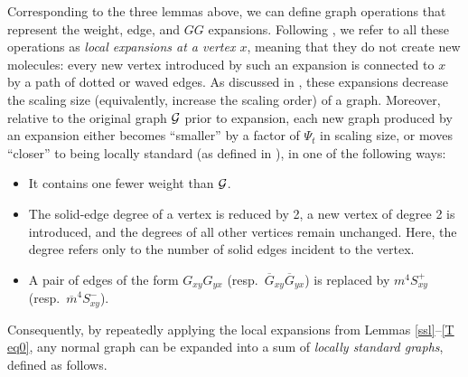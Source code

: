 Corresponding to the three lemmas above, we can define graph operations that represent the weight, edge, and $GG$ expansions. Following \cite{yang2021delocalization}, we refer to all these operations as \emph{local expansions at a vertex $x$}, meaning that they do not create new molecules: every new vertex introduced by such an expansion is connected to $x$ by a path of dotted or waved edges. 
As discussed in \cite[Section 3]{yang2021delocalization}, these expansions decrease the scaling size (equivalently, increase the scaling order) of a graph. Moreover, relative to the original graph $\cal G$ prior to expansion, each new graph produced by an expansion either becomes ``smaller'' by a factor of $\Psi_t$ in scaling size, or moves ``closer'' to being locally standard (as defined in ), in one of the following ways:
\begin{itemize}
    
\item It contains one fewer weight than $\cal G$.

\item The solid-edge degree of a vertex is reduced by 2, a new vertex of degree 2 is introduced, and the degrees of all other vertices remain unchanged. Here, the degree refers only to the number of solid edges incident to the vertex.

    
\item A pair of edges of the form $G_{xy} G_{y x }$ (resp.~$\overline G_{xy} \overline G_{yx}$) is replaced by $m^4 S^{+}_{xy}$ (resp.~$\overline m^4 S^{-}_{xy}$).

\end{itemize}
Consequently, by repeatedly applying the local expansions from Lemmas \ref{ssl}--\ref{T eq0}, any normal graph can be expanded into a sum of \emph{locally standard graphs}, defined as follows. 



